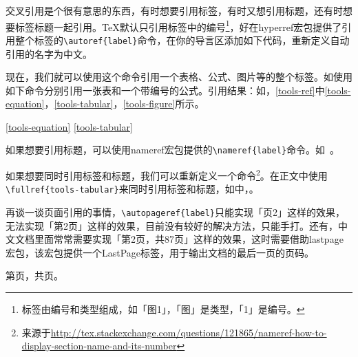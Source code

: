 交叉引用是个很有意思的东西，有时想要引用标签，有时又想引用标题，还有时想要标签标题一起引用。\TeX{}默认只引用标签中的编号\footnote{标签由编号和类型组成，如「图1」，「图」是类型，「1」是编号。}，好在hyperref宏包提供了引用整个标签的\lstinline|\autoref{label}|命令，在你的导言区添加如下代码，重新定义自动引用的名字为中文。

\begin{latex}
\end{latex}

现在，我们就可以使用这个命令引用一个表格、公式、图片等的整个标签。如使用如下命令分别引用一张表和一个带编号的公式。引用结果：如，\autoref{tools-ref}中\autoref{tools-equation}，\autoref{tools-tabular}，\autoref{tools-figure}所示。

\begin{latex}
\ref{tools-equation}
\ref{tools-tabular}
\end{latex}

如果想要引用标题，可以使用nameref宏包提供的\lstinline|\nameref{label}|命令。如~。

如果想要同时引用标签和标题，我们可以重新定义一个命令\footnote{来源于\url{http://tex.stackexchange.com/questions/121865/nameref-how-to-display-section-name-and-its-number}}。在正文中使用\lstinline|\fullref{tools-tabular}|来同时引用标签和标题，如中，。

\begin{latex}
\newcommand*{\fullref}[1]{\hyperref[{#1}]{\autoref*{#1} \nameref*{#1}}}
\end{latex}

再谈一谈页面引用的事情，\lstinline|\autopageref{label}|只能实现「页2」这样的效果，无法实现「第2页」这样的效果，目前没有较好的解决方法，只能手打。还有，中文文档里面常常需要实现「第2页，共87页」这样的效果，这时需要借助lastpage宏包，该宏包提供一个LastPage标签，用于输出文档的最后一页的页码。

\begin{codeshow}
第\pageref{tools-ref}页，共\pageref{LastPage}页。
\end{codeshow}

